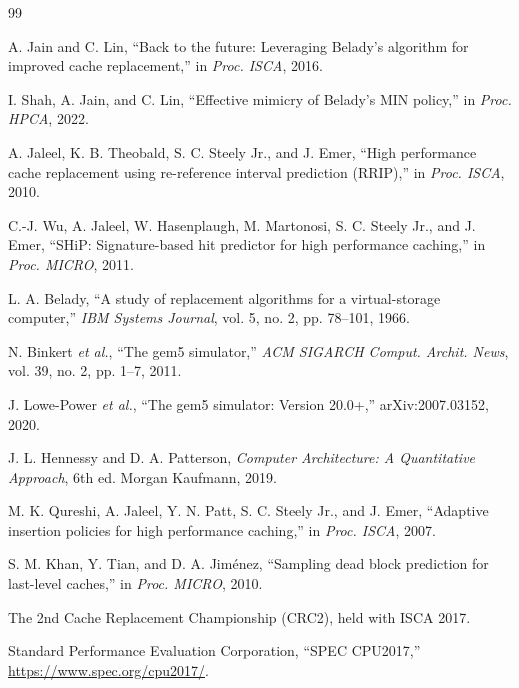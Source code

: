 \documentclass[lettersize,journal]{IEEEtran}
\begin{document}
\begin{thebibliography}{99}

A. Jain and C. Lin, ``Back to the future: Leveraging Belady's algorithm for
improved cache replacement,'' in \emph{Proc. ISCA}, 2016.

I. Shah, A. Jain, and C. Lin, ``Effective mimicry of Belady's MIN policy,'' in
\emph{Proc. HPCA}, 2022.

A. Jaleel, K. B. Theobald, S. C. Steely Jr., and J. Emer, ``High performance
cache replacement using re-reference interval prediction (RRIP),'' in
\emph{Proc. ISCA}, 2010.

C.-J. Wu, A. Jaleel, W. Hasenplaugh, M. Martonosi, S. C. Steely Jr., and
J. Emer, ``SHiP: Signature-based hit predictor for high performance caching,''
in \emph{Proc. MICRO}, 2011.

L. A. Belady, ``A study of replacement algorithms for a virtual-storage
computer,'' \emph{IBM Systems Journal}, vol. 5, no. 2, pp. 78--101, 1966.

N. Binkert \emph{et al.}, ``The gem5 simulator,'' \emph{ACM SIGARCH Comput.
Archit. News}, vol. 39, no. 2, pp. 1--7, 2011.

J. Lowe-Power \emph{et al.}, ``The gem5 simulator: Version 20.0+,''
arXiv:2007.03152, 2020.

J. L. Hennessy and D. A. Patterson, \emph{Computer Architecture: A Quantitative
Approach}, 6th ed. Morgan Kaufmann, 2019.

M. K. Qureshi, A. Jaleel, Y. N. Patt, S. C. Steely Jr., and J. Emer, ``Adaptive
insertion policies for high performance caching,'' in \emph{Proc. ISCA}, 2007.

S. M. Khan, Y. Tian, and D. A. Jim\'enez, ``Sampling dead block prediction for
last-level caches,'' in \emph{Proc. MICRO}, 2010.

The 2nd Cache Replacement Championship (CRC2), held with ISCA 2017.

Standard Performance Evaluation Corporation, ``SPEC CPU2017,''
\url{https://www.spec.org/cpu2017/}.

\end{thebibliography}
\end{document}
